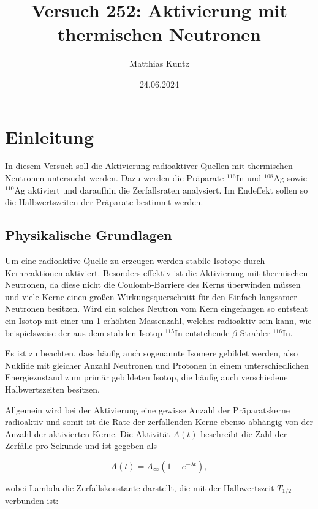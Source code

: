 \documentclass{article}
\title{Versuch 252: Aktivierung mit thermischen Neutronen}
\author{Matthias Kuntz}
\date{24.06.2024}
\begin{document}
\maketitle

\tableofcontents

\newpage

\section{Einleitung}

In diesem Versuch soll die Aktivierung radioaktiver Quellen mit thermischen Neutronen untersucht werden. Dazu werden die Präparate $^{116}$In und $^{108}$Ag sowie $^{110}$Ag aktiviert und daraufhin die Zerfallsraten analysiert. Im Endeffekt sollen so die Halbwertszeiten der Präparate bestimmt werden.

\subsection{Physikalische Grundlagen}

Um eine radioaktive Quelle zu erzeugen werden stabile Isotope durch Kernreaktionen aktiviert. Besonders effektiv ist die Aktivierung mit thermischen Neutronen, da diese nicht die Coulomb-Barriere des Kerns überwinden müssen und viele Kerne einen großen Wirkungsquerschnitt für den Einfach langsamer Neutronen besitzen. Wird ein solches Neutron vom Kern eingefangen so entsteht ein Isotop mit einer um 1 erhöhten Massenzahl, welches radioaktiv sein kann, wie beispielsweise der aus dem stabilen Isotop $^{115}$In entstehende $\beta$-Strahler $^{116}$In. 

Es ist zu beachten, dass häufig auch sogenannte Isomere gebildet werden, also Nuklide mit gleicher Anzahl Neutronen und Protonen in einem unterschiedlichen Energiezustand zum primär gebildeten Isotop, die häufig auch verschiedene Halbwertszeiten besitzen.

Allgemein wird bei der Aktivierung eine gewisse Anzahl der Präparatskerne radioaktiv und somit ist die Rate der zerfallenden Kerne ebenso abhängig von der Anzahl der aktivierten Kerne. Die Aktivität $A(t)$ beschreibt die Zahl der Zerfälle pro Sekunde und ist gegeben als 

\begin{equation}
    A(t) = A_\infty (1 - e^{-\lambda t}),
\end{equation}

wobei Lambda die Zerfallskonstante darstellt, die mit der Halbwertszeit $T_{1/2}$ verbunden ist:
\end{document}
